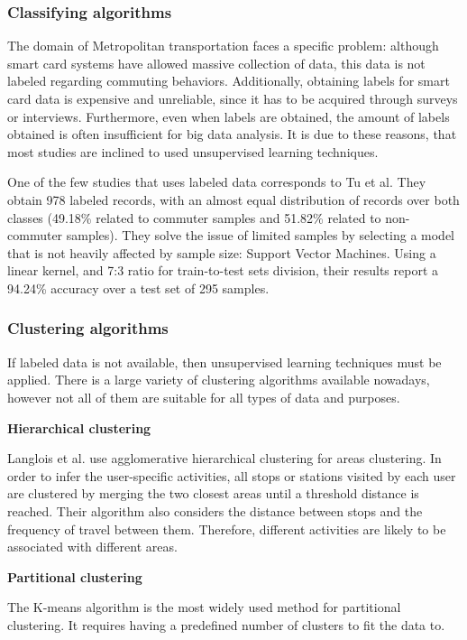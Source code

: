 \documentclass{article}
\begin{document}
\subsubsection{Classifying algorithms}
The domain of Metropolitan transportation faces a specific problem: although smart card systems have allowed massive collection of data, this data is not labeled regarding commuting behaviors. Additionally, obtaining labels for smart card data is expensive and unreliable, since it has to be acquired through surveys or interviews. Furthermore, even when labels are obtained, the amount of labels obtained is often insufficient for big data analysis. It is due to these reasons, that most studies are inclined to used unsupervised learning techniques. 

One of the few studies that uses labeled data corresponds to Tu et al. They obtain 978 labeled records, with an almost equal distribution of records over both classes (49.18\% related to commuter samples and 51.82\% related to non-commuter samples). They solve the issue of limited samples by selecting a model that is not heavily affected by sample size: Support Vector Machines. Using a linear kernel, and 7:3 ratio for train-to-test sets division, their results report a 94.24\% accuracy over a test set of 295 samples. 

\subsubsection{Clustering algorithms} 
If labeled data is not available, then unsupervised learning techniques must be applied. There is a large variety of clustering algorithms available nowadays, however not all of them are suitable for all types of data and purposes.

\textbf{Hierarchical clustering}

Langlois et al. \cite{langlois2016inferring} use agglomerative hierarchical clustering for areas clustering. In order to infer the user-specific activities, all stops or stations visited by each user are clustered by merging the two closest areas until a threshold distance is reached. Their algorithm also considers the distance between stops and the frequency of travel between them. Therefore, different activities are likely to be associated with different areas.

\textbf{Partitional clustering}

The K-means algorithm is the most widely used method for partitional clustering. It requires having a predefined number of clusters to fit the data to. 
\end{document}
